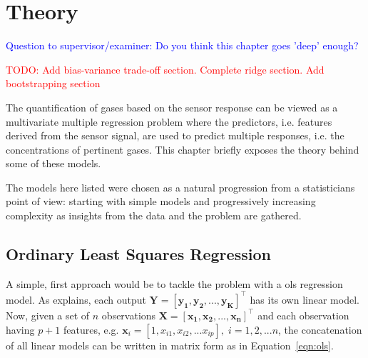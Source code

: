 
\chapter{Theory}
\label{cha:theory}

\textcolor{blue}{Question to supervisor/examiner: Do you think this chapter goes 'deep' enough?} 

\textcolor{red}{TODO: Add bias-variance trade-off section. Complete ridge section. Add bootstrapping section} 

The quantification of gases based on the sensor response can be viewed as a multivariate multiple regression problem where the predictors, i.e. features derived from the sensor signal, are used to predict multiple responses, i.e. the concentrations of pertinent gases. This chapter briefly exposes the theory behind some of these models.

The models here listed were chosen as a natural progression from a statisticians point of view: starting with simple models and progressively increasing complexity as insights from the data and the problem are gathered.

\section{Ordinary Least Squares Regression}
\label{sec:linreg}

A simple, first approach would be to tackle the problem with a \acrfull{ols} regression model. As \cite{friedman2001} explains, each output  $\mathbf{Y = [y_1, y_2, ... , y_K]^\intercal} $ has its own linear model. Now, given a set of $n$ observations $\mathbf{X = [x_1, x_2, ..., x_n]^\intercal}$ and each observation having $p+1$ features, e.g. $\mathbf{x}_i = [1,x_{i1}, x_{i2}, ... x_{ip}], \; i = 1,2,...n$, the concatenation of all linear models can be written in matrix form as in Equation~\ref{eqn:ols}.

